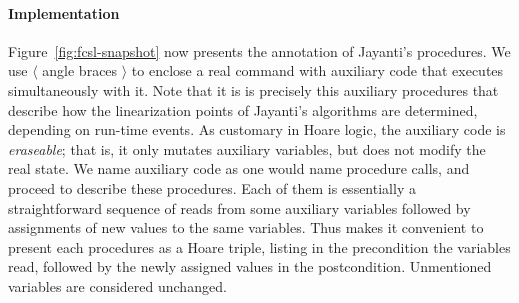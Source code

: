 


\paragraph{Implementation}%

Figure~\ref{fig:fcsl-snapshot} now presents the annotation of
Jayanti's procedures. We use $\langle$ angle braces $\rangle$ to
enclose a real command with auxiliary code that executes
simultaneously with it.  Note that it is is precisely this auxiliary
procedures that describe how the linearization points of Jayanti's
algorithms are determined, depending on run-time events.
%
As customary in Hoare logic, the auxiliary code is \emph{eraseable};
that is, it only mutates auxiliary variables, but does not modify the
real state. 
%
We name auxiliary code as one would name procedure calls, and proceed
to describe these procedures. Each of them is essentially a
straightforward sequence of reads from some auxiliary variables
followed by assignments of new values to the same variables. Thus
makes it convenient to present each procedures as a Hoare triple,
listing in the precondition the variables read, followed by the newly
assigned values in the postcondition. Unmentioned variables are
considered unchanged.
%
